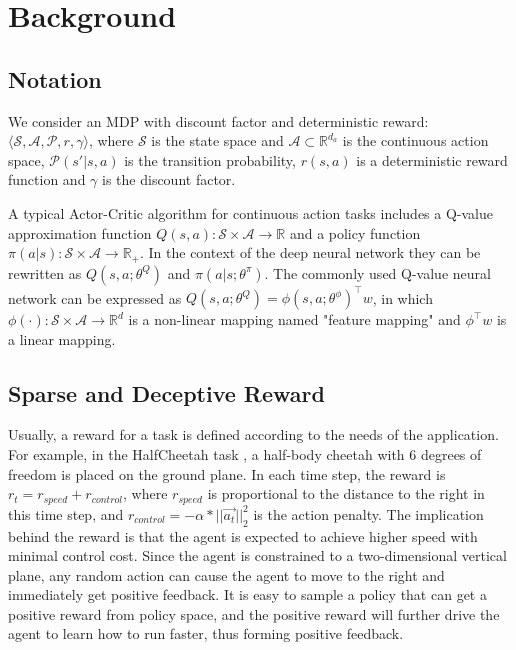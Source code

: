 \section{Background}
\subsection{Notation}
We consider an MDP with discount factor and deterministic reward: $\langle \mathcal{S},\mathcal{A},\mathcal{P},r,\gamma \rangle$, where $\mathcal{S}$ is the state space and $\mathcal{A}\subset \mathbb{R}^{d_a}$ is the continuous action space, $\mathcal{P}(s'|s,a)$ is the transition probability, $r(s,a)$ is a deterministic reward function and $\gamma$ is the discount factor.

A typical Actor-Critic algorithm for continuous action tasks includes a Q-value approximation function $Q(s,a):\mathcal{S}\times\mathcal{A}\rightarrow\mathbb{R}$ and a policy function $\pi(a|s):\mathcal{S}\times\mathcal{A}\rightarrow\mathbb{R_+}$. In the context of the deep neural network they can be rewritten as $Q(s,a;\theta^{Q})$ and $\pi(a|s;\theta^{\pi})$. The commonly used Q-value neural network can be expressed as $Q(s,a;\theta^{Q}) = \phi(s,a;\theta^{\phi})^{\top}w$, in which $\phi(\cdot):\mathcal{S}\times\mathcal{A}\rightarrow\mathbb{R}^d$ is a non-linear mapping named "feature mapping" and $\phi^{\top}w$ is a linear mapping.

\subsection{Sparse and Deceptive Reward}
\label{sec:tasks}
Usually, a reward for a task is defined according to the needs of the application. For example, in the HalfCheetah task \cite{mujoco}, a half-body cheetah with 6 degrees of freedom is placed on the ground plane. In each time step, the reward is $r_t = r_{speed} + r_{control}$, where $r_{speed}$ is proportional to the distance to the right in this time step, and $r_{control} = -\alpha*||\vec{a_t}||^2_2$ is the action penalty. The implication behind the reward is that the agent is expected to achieve higher speed with minimal control cost. Since the agent is constrained to a two-dimensional vertical plane, any random action can cause the agent to move to the right and immediately get positive feedback. It is easy to sample a policy that can get a positive reward from policy space, and the positive reward will further drive the agent to learn how to run faster, thus forming positive feedback.

